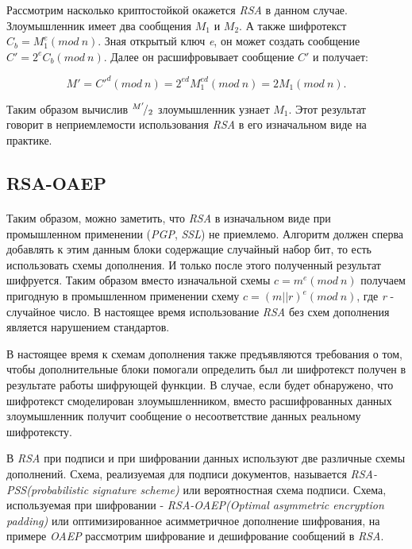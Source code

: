   Рассмотрим насколько криптостойкой окажется \textit{RSA} в данном случае. Злоумышленник имеет два сообщения {$M_1$} и 
  {$M_2$}. А также шифротекст {$C_{b}=M^{e}_{1}(mod \: n)$}. Зная открытый ключ \textit{e}, он может 
  создать сообщение {$C'=2^{e} C_{b}(mod \: n)$}. Далее он расшифровывает сообщение $C'$ и получает:

    \begin{equation}
      \textit{{$M'=C'^d(mod \: n)=2^{e d}M_{1}^{e d}(mod \: n)=2M_{1}(mod \: n).$}} 
    \end{equation}

  Таким образом вычислив {${}^{M'}\!/_{2}$} злоумышленник узнает {$M_1$}. Этот результат говорит в неприемлемости использования \textit{RSA} в его изначальном виде на практике.

\subsection{RSA-OAEP}

\paragraph{} Таким образом, можно заметить, что \textit{RSA} в изначальном виде при промышленном применении (\textit{PGP}, \textit{SSL}) не приемлемо. Алгоритм должен сперва добавлять к этим данным блоки содержащие случайный набор бит, то есть использовать схемы дополнения. И только после этого полученный
  результат шифруется. Таким образом вместо изначальной схемы {$c=m^{e}(mod \: n)$} получаем пригодную в промышленном применении схему 
  {$c=(m||r)^{e}(mod \: n)$}, где \textit{r} - случайное число. В настоящее время использование
  \textit{RSA} без схем дополнения является нарушением стандартов.

  В настоящее время к схемам дополнения также предъявляются требования о том, чтобы дополнительные блоки помогали определить был ли шифротекст получен в результате работы 
  шифрующей функции. В случае, если будет обнаружено, что шифротекст смоделирован злоумышленником, вместо расшифрованных данных 
  злоумышленник получит сообщение о несоответствие данных реальному шифротексту.

  В \textit{RSA} при подписи и при шифровании данных используют две различные схемы дополнений. Схема, реализуемая для подписи документов, называется 
  \textit{RSA-PSS(probabilistic signature scheme)} или вероятностная схема подписи. Схема, используемая при шифровании - 
  \textit{RSA-OAEP(Optimal asymmetric encryption padding)} или оптимизированное асимметричное дополнение шифрования, на примере \textit{OAEP} рассмотрим 
  шифрование и дешифрование сообщений в \textit{RSA}.

